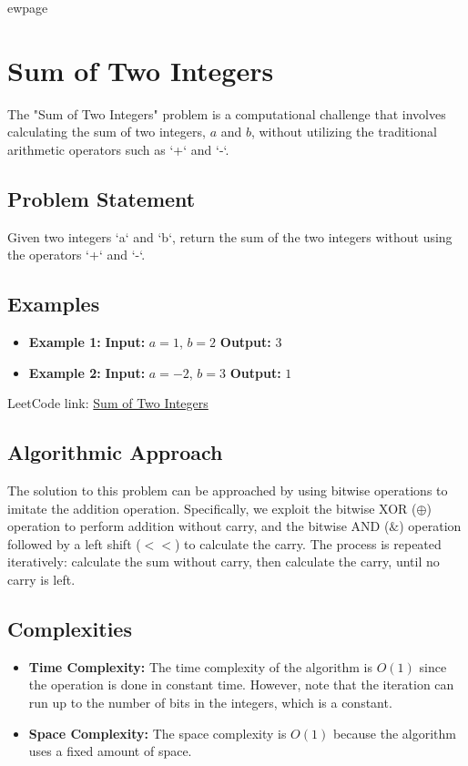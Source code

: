 
ewpage

\chapter{Sum of Two Integers}
\label{chap:Sum_of_Two_Integers}

The "Sum of Two Integers" problem is a computational challenge that involves calculating the sum of two integers, \(a\) and \(b\), without utilizing the traditional arithmetic operators such as `+` and `-`.

\section*{Problem Statement}
Given two integers `a` and `b`, return the sum of the two integers without using the operators `+` and `-`.

\section*{Examples}
\begin{itemize}
    \item \textbf{Example 1:}
    \subitem \textbf{Input:} \(a = 1\), \(b = 2\)
    \subitem \textbf{Output:} \(3\)

    \item \textbf{Example 2:}
    \subitem \textbf{Input:} \(a = -2\), \(b = 3\)
    \subitem \textbf{Output:} \(1\)
\end{itemize}

LeetCode link: \href{https://leetcode.com/problems/sum-of-two-integers/}{Sum of Two Integers}

\section*{Algorithmic Approach}
The solution to this problem can be approached by using bitwise operations to imitate the addition operation. Specifically, we exploit the bitwise XOR (\( \oplus \)) operation to perform addition without carry, and the bitwise AND (\( \& \)) operation followed by a left shift (\( << \)) to calculate the carry. The process is repeated iteratively: calculate the sum without carry, then calculate the carry, until no carry is left.

\section*{Complexities}
\begin{itemize}
	\item \textbf{Time Complexity:} The time complexity of the algorithm is \(O(1)\) since the operation is done in constant time. However, note that the iteration can run up to the number of bits in the integers, which is a constant.
	
	\item \textbf{Space Complexity:} The space complexity is \(O(1)\) because the algorithm uses a fixed amount of space.
\end{itemize}



